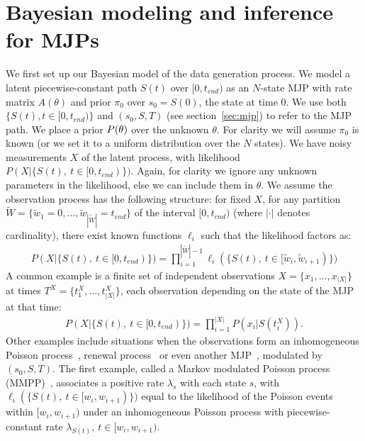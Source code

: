 \section{Bayesian modeling and inference for MJPs}
\label{sec:bayes_model}
We first set up our Bayesian model of the data generation process. 
We model a latent piecewise-constant path $S(t)$ over $[0,t_{end})$ as an $N$-state MJP with rate matrix $A(\theta)$ and prior $\pi_0$ over $s_0 = S(0)$, the state at time $0$. 
We use both $\{S(t), t \in [0,t_{end})\}$ and $(s_0,S,T)$ (see section~\ref{sec:mjp}) to refer to the MJP path.
We place a prior $P(\theta)$ over the unknown $\theta$. 
For clarity we will assume $\pi_0$ is known (or we set it to a uniform distribution over the $N$ states). 
We have noisy measurements $X$ of the latent process, with likelihood $P(X|\{S(t),\ t \in [0,t_{end})\})$.
Again, for clarity we ignore any unknown parameters in the likelihood, else we can include them in $\theta$.
We assume the observation process has the following structure: for fixed $X$, for any partition $\tilde{W} = \{\tilde{w}_1 = 0, \dotsc, \tilde{w}_{|\tilde{W}|}=t_{end}\}$ of the interval $[0,t_{end})$ (where $|\cdot|$ denotes cardinality), there exist known functions $\ell_i$ such that the likelihood factors as:
\begin{align}
  \label{eq:lik_factor}
  P(X|\{S(t),\ t \in [0,t_{end})\}) = \prod_{i=1}^{|\tilde{W}|-1} \ell_i(\{S(t),\ t \in [\tilde{w}_{i},\tilde{w}_{i+1})\})
\end{align}
A common example is a finite set of independent observations $X = \{x_1,\dotsc,x_{|X|}\}$ at times $T^X = \{t^X_1,\dotsc, t^X_{|X|}\}$, each observation depending on the state of the MJP at that time:
\begin{align}
  \label{eq:lik_iid}
  P(X|\{S(t),\ t \in [0,t_{end})\}) = \prod_{i=1}^{|X|} P(x_i|S(t^X_i)).
\end{align}
Other examples include situations when the observations form an inhomogeneous Poisson process~\citep{FearnSher2006}, renewal process~\citep{rao2011gaussian} or even another MJP~\citep{Nodelman+al:UAI02,RaoTeh13}, modulated by $(s_0, S, T)$.
The first example, called a Markov modulated Poisson process (MMPP)~\citep{scottmmpp03}, associates a positive rate $\lambda_s$ with each state $s$, with $\ell_i(\{S(t),\ t \in [w_{i},w_{i+1})\})$ equal to the likelihood of the Poisson events within $[w_{i},w_{i+1})$ under an inhomogeneous Poisson process with piecewise-constant rate $\lambda_{S(t)},\ t \in [w_{i},w_{i+1})$.

